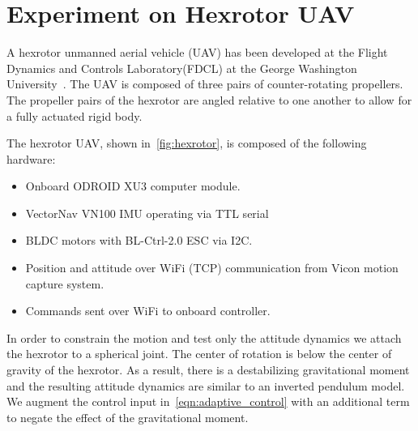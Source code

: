 \documentclass[letterpaper, 10 pt, conference]{ieeeconf}  %
\begin{document}
\section{Experiment on Hexrotor UAV}
A hexrotor unmanned aerial vehicle (UAV) has been developed at the Flight Dynamics and Controls Laboratory(FDCL) at the George Washington University~\cite{kaufman2014}.
The UAV is composed of three pairs of counter-rotating propellers. 
The propeller pairs of the hexrotor are angled relative to one another to allow for a fully actuated rigid body.

The hexrotor UAV, shown in~\cref{fig:hexrotor}, is composed of the following hardware:
\begin{itemize}
	\item Onboard ODROID XU3 computer module.
	\item VectorNav VN100 IMU operating via TTL serial %
	\item BLDC motors with BL-Ctrl-2.0 ESC via I2C.
	\item Position and attitude over WiFi (TCP) communication from Vicon motion capture system.
	\item Commands sent over WiFi to  onboard controller. 
\end{itemize}
In order to constrain the motion and test only the attitude dynamics we attach the hexrotor to a spherical joint.
The center of rotation is below the center of gravity of the hexrotor.
As a result, there is a destabilizing gravitational moment and the resulting attitude dynamics are similar to an inverted pendulum model.
We augment the control input in~\cref{eqn:adaptive_control} with an additional term to negate the effect of the gravitational moment.
\end{document}
